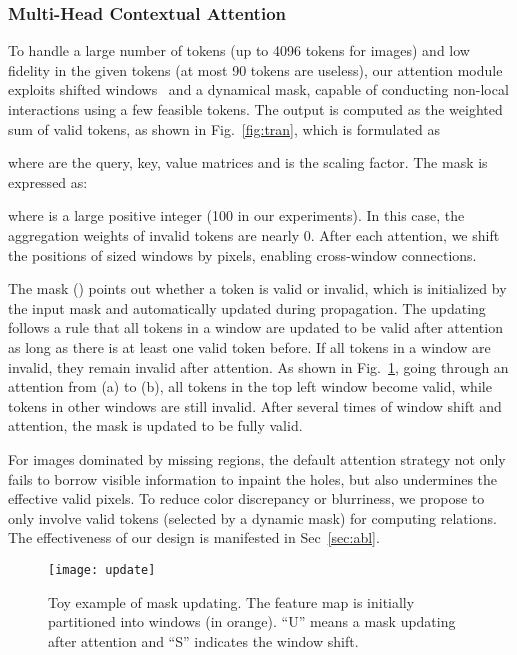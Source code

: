 \documentclass[10pt,twocolumn,letterpaper]{article}
\begin{document}
	
	\subsubsection{Multi-Head Contextual Attention}
	\label{sec:mca}
	
	To handle a large number of tokens (up to 4096 tokens for  images) and low fidelity in the given tokens (at most 90 tokens are useless), our attention module exploits shifted windows~\cite{liu2021Swin} and a dynamical mask, capable of conducting non-local interactions using a few feasible tokens. The output is computed as the weighted sum of valid tokens, as shown in Fig.~\ref{fig:tran}, which is formulated as
	
	where  are the query, key, value matrices and  is the scaling factor. The mask  is expressed as:
	
	where  is a large positive integer (100 in our experiments). In this case, the aggregation weights of invalid tokens are nearly 0. After each attention, we shift the positions of  sized windows by  pixels, enabling cross-window connections.
	
	\vspace{0.08in}
	The mask () points out whether a token is valid or invalid, which is initialized by the input mask and automatically updated during propagation. The updating follows a rule that all tokens in a window are updated to be valid after attention as long as there is at least one valid token before. If all tokens in a window are invalid, they remain invalid after attention. As shown in Fig.~\ref{fig:update}, going through an attention from (a) to (b), all tokens in the top left window become valid, while tokens in other windows are still invalid. After several times of window shift and attention, the mask is updated to be fully valid.
	
	\vspace{0.08in}
	For images dominated by missing regions, the default attention strategy not only fails to borrow visible information to inpaint the holes, but also undermines the effective valid pixels. To reduce color discrepancy or blurriness, we propose to only involve valid tokens (selected by a dynamic mask) for computing relations. The effectiveness of our design is manifested in Sec~\ref{sec:abl}.
	
	\begin{figure}[t]
		\begin{center}
			\texttt{[image: update]}
		\end{center}
		\vspace{-0.2in}
		\caption{Toy example of mask updating. The feature map is initially partitioned into  windows (in orange). ``U'' means a mask updating after attention and ``S'' indicates the window shift.  }
		\label{fig:update}
		\vspace{-0.1in}
	\end{figure}
	
\end{document}
